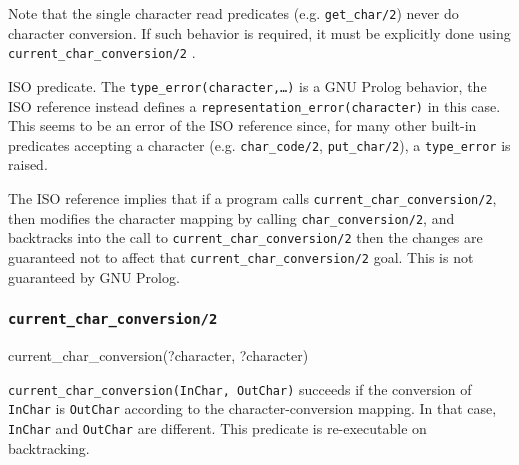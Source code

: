 Note that the single character read predicates (e.g. \texttt{get\_char/2})
never do character conversion. If such behavior is required, it must be
explicitly done using \texttt{current\_char\_conversion/2}
.

\begin{PlErrors}





\end{PlErrors}

\Portability

ISO predicate. The \texttt{type\_error(character,\ldots)} is a GNU Prolog
behavior, the ISO reference instead defines a
\texttt{representation\_error(character)} in this case. This seems to be an
error of the ISO reference since, for many other built-in predicates
accepting a character (e.g. \texttt{char\_code/2}, \texttt{put\_char/2}), a
\texttt{type\_error} is raised. 

The ISO reference implies that if a program calls
\texttt{current\_char\_conversion/2}, then modifies the character mapping by
calling \texttt{char\_conversion/2}, and backtracks into the call to
\texttt{current\_char\_conversion/2} then the changes are guaranteed not to
affect that \texttt{current\_char\_conversion/2} goal. This is not guaranteed
by GNU Prolog.

\subsubsection{\texttt{current\_char\_conversion/2}}
\label{current-char-conversion/2}

\begin{TemplatesOneCol}
current\_char\_conversion(?character, ?character)

\end{TemplatesOneCol}

\Description

\texttt{current\_char\_conversion(InChar, OutChar)} succeeds if the
conversion of \texttt{InChar} is \texttt{OutChar} according to the
character-conversion mapping. In that case, \texttt{InChar} and
\texttt{OutChar} are different. This predicate is re-executable on
backtracking.

